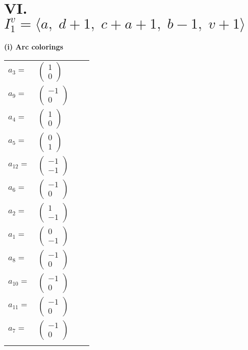 \documentclass[1p]{elsarticle_modified}
\theoremstyle{definition}
\begin{document}
\centering \section*{VI. $I^v_{1}= \langle a,\;d+1,\;c+a+1,\;b-1,\;v+1 \rangle$}
\flushleft \textbf{(i) Arc colorings}\\
\begin{tabular}{m{7pt} m{180pt} m{7pt} m{180pt} }
\flushright $a_{3}=$&$\begin{pmatrix}1\\0\end{pmatrix}$ \\
\flushright $a_{9}=$&$\begin{pmatrix}-1\\0\end{pmatrix}$ \\
\flushright $a_{4}=$&$\begin{pmatrix}1\\0\end{pmatrix}$ \\
\flushright $a_{5}=$&$\begin{pmatrix}0\\1\end{pmatrix}$ \\
\flushright $a_{12}=$&$\begin{pmatrix}-1\\-1\end{pmatrix}$ \\
\flushright $a_{6}=$&$\begin{pmatrix}-1\\0\end{pmatrix}$ \\
\flushright $a_{2}=$&$\begin{pmatrix}1\\-1\end{pmatrix}$ \\
\flushright $a_{1}=$&$\begin{pmatrix}0\\-1\end{pmatrix}$ \\
\flushright $a_{8}=$&$\begin{pmatrix}-1\\0\end{pmatrix}$ \\
\flushright $a_{10}=$&$\begin{pmatrix}-1\\0\end{pmatrix}$ \\
\flushright $a_{11}=$&$\begin{pmatrix}-1\\0\end{pmatrix}$ \\
\flushright $a_{7}=$&$\begin{pmatrix}-1\\0\end{pmatrix}$\\&\end{tabular}
\end{document}
